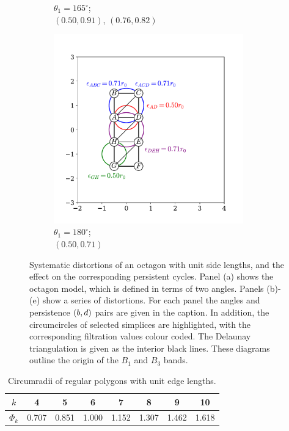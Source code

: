 \begin{figure}[tb]
\begin{subfigure}[b]{0.32\textwidth}
         \caption{$\theta_1=165^\circ$; \\$\left(0.50,0.91\right)$, $\left(0.76,0.82\right)$ }
         \label{fig:b3d}
     \end{subfigure}
      \hfill
     \begin{subfigure}[b]{0.32\textwidth}
         \centering
         \includegraphics[width=0.9\textwidth]{./figures/ph/sl_oct_b3_180.pdf}
         \caption{$\theta_1=180^\circ$; \\$\left(0.50,0.71\right)$}
         \label{fig:b3e}
     \end{subfigure}
   
	\caption{Systematic distortions of an octagon with unit side lengths, and the effect on the corresponding persistent cycles. Panel (a) shows the octagon model, which is defined in terms of two angles. Panels (b)\--(e) show a series of distortions. For each panel the angles and persistence $\left(b,d\right)$ pairs are given in the caption. In addition, the circumcircles of selected simplices are highlighted, with the corresponding filtration values colour coded. The Delaunay triangulation is given as the interior black lines. These diagrams outline the origin of the $B_1$ and $B_3$ bands.}
	\label{fig:b3}
\end{figure}

\begin{table}[hbt]
\centering
\caption{Circumradii of regular polygons with unit edge lengths.}
\label{tab:circumradii}
\begin{tabular}{cccccccc}
\toprule
$k$ & 4 & 5 & 6 & 7 & 8 & 9 & 10 \\
\midrule
$\Phi_k$ & 0.707 & 0.851 & 1.000 & 1.152 & 1.307 & 1.462 & 1.618 \\
\bottomrule
\end{tabular}
\end{table}

